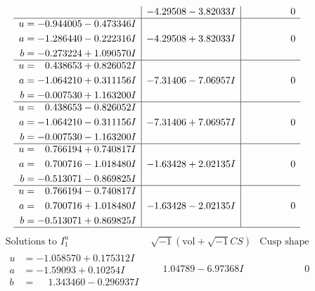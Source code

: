 \documentclass[1p]{elsarticle_modified}
\theoremstyle{definition}
\newcommand{\I}{\sqrt{-1}}
\begin{document}
$$\begin{array}{c|c|c}
 & -4.29508 - 3.82033 I & \phantom{-0.000000 } 0 \\ \hline\begin{aligned}
u &= -0.944005 - 0.473346 I \\
a &= -1.286440 - 0.222316 I \\
b &= -0.273224 + 1.090570 I\end{aligned}
 & -4.29508 + 3.82033 I & \phantom{-0.000000 } 0 \\ \hline\begin{aligned}
u &= \phantom{-}0.438653 + 0.826052 I \\
a &= -1.064210 + 0.311156 I \\
b &= -0.007530 + 1.163200 I\end{aligned}
 & -7.31406 - 7.06957 I & \phantom{-0.000000 } 0 \\ \hline\begin{aligned}
u &= \phantom{-}0.438653 - 0.826052 I \\
a &= -1.064210 - 0.311156 I \\
b &= -0.007530 - 1.163200 I\end{aligned}
 & -7.31406 + 7.06957 I & \phantom{-0.000000 } 0 \\ \hline\begin{aligned}
u &= \phantom{-}0.766194 + 0.740817 I \\
a &= \phantom{-}0.700716 - 1.018480 I \\
b &= -0.513071 - 0.869825 I\end{aligned}
 & -1.63428 + 2.02135 I & \phantom{-0.000000 } 0 \\ \hline\begin{aligned}
u &= \phantom{-}0.766194 - 0.740817 I \\
a &= \phantom{-}0.700716 + 1.018480 I \\
b &= -0.513071 + 0.869825 I\end{aligned}
 & -1.63428 - 2.02135 I & \phantom{-0.000000 } 0\\
 \hline 
 \end{array}$$\newpage$$\begin{array}{c|c|c}  
\text{Solutions to }I^u_{1}& \I (\text{vol} + \sqrt{-1}CS) & \text{Cusp shape}\\
 \hline 
\begin{aligned}
u &= -1.058570 + 0.175312 I \\
a &= -1.59093 + 0.10254 I \\
b &= \phantom{-}1.343460 - 0.296937 I\end{aligned}
 & \phantom{-}1.04789 - 6.97368 I & \phantom{-0.000000 } 0 \\ \hline\begin{aligned}

\end{aligned}
\end{array}$$
\end{document}
